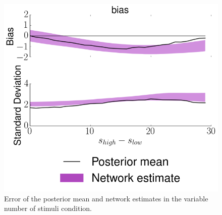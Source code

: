\documentclass{article} %
\begin{document}
\begin{figure}[h]
\centering
\includegraphics[width = .7\textwidth]{Single_Estimation.png}
\caption{Error of the posterior mean and network estimates in the variable number of stimuli condition.}
\end{figure}
\end{document}
